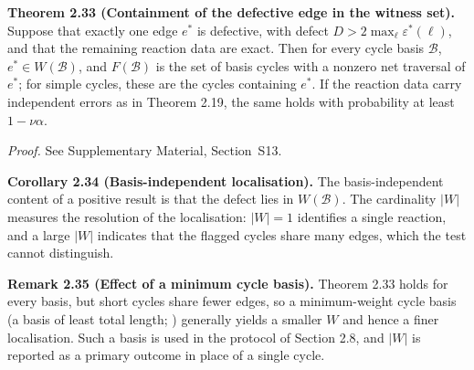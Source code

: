 \documentclass[11pt,a4paper]{article}
\theoremstyle{pstyle}
\theoremstyle{definition}
\theoremstyle{remark}
\newcommand{\abs}[1]{\lvert#1\rvert}
\newcommand{\eps}{\varepsilon}
\newcommand{\epsstar}{\eps^{\ast}}
\begin{document}
\par\noindent\textbf{Theorem 2.33 (Containment of the defective edge in the witness set).}\label{thm:witness-contains} 
Suppose that exactly one edge $e^{\ast}$ is defective, with defect $D >
2\max_\ell \epsstar(\ell)$, and that the remaining reaction data are
exact. Then for every cycle basis $\mathcal{B}$, $e^{\ast}\in
W(\mathcal{B})$, and $F(\mathcal{B})$ is the set of basis cycles with a
nonzero net traversal of $e^{\ast}$; for simple cycles, these are the
cycles containing $e^{\ast}$. If the reaction data carry independent
errors as in Theorem 2.19, the same holds with probability at
least $1-\nu\alpha$.
\par

\noindent\emph{Proof.} See Supplementary Material, Section~S13.

\par\noindent\textbf{Corollary 2.34 (Basis-independent localisation).}\label{cor:localise-witness} 
The basis-independent content of a positive result is that the defect
lies in $W(\mathcal{B})$. The cardinality $\abs{W}$ measures the
resolution of the localisation: $\abs{W}=1$ identifies a single
reaction, and a large $\abs{W}$ indicates that the flagged cycles share
many edges, which the test cannot distinguish.
\par

\par\noindent\textbf{Remark 2.35 (Effect of a minimum cycle basis).}\label{rem:mcb} 
Theorem 2.33 holds for every basis, but short cycles
share fewer edges, so a minimum-weight cycle basis (a basis of least
total length; \citealp{horton1987,kavitha2009}) generally yields a
smaller $W$ and hence a finer localisation. Such a basis is used in the
protocol of Section 2.8, and $\abs{W}$ is reported as a primary
outcome in place of a single cycle.
\par
\end{document}
